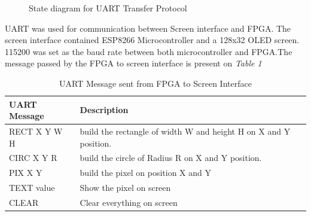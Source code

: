 \documentclass[a4paper,12pt]{article}
\begin{document}
    \begin{figure}[H]
    \caption{State diagram for UART Transfer Protocol} 
    \end{figure}

    UART was used for communication between Screen interface and FPGA. The screen interface contained  ESP8266 Microcontroller and a 128x32 OLED screen. 115200 was set as the baud rate between both microcontroller and FPGA.The message passed by the FPGA to screen interface is present on  \textit{Table 1} 

    \begin{table}[H]
        \footnotesize
        \setlength{\tabcolsep}{0.3em} %
        \begin{tabular}{|l|l|}
            \hline
            \textbf{UART Message}  & \textbf{Description} \\ \hline
            RECT X Y W H & build the rectangle of width W and height H on X and Y position. \\ \hline
            CIRC X Y R& build the circle of Radius R on X and Y position. \\ \hline
            PIX X Y & build the pixel on position X and Y\\ \hline
            TEXT value & Show the pixel on screen \\ \hline
            CLEAR & Clear everything on screen \\ \hline
        \end{tabular}
        \caption{UART Message sent from FPGA to Screen Interface}
    \end{table}
\end{document}
